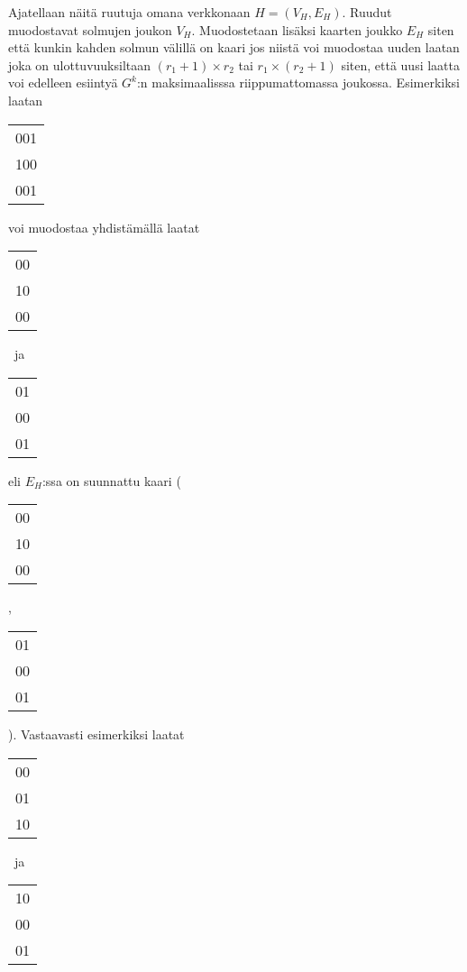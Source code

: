 \documentclass[12pt,finnish]{tktltiki2}
\theoremstyle{definition}
\theoremstyle{remark}
\begin{document}
Ajatellaan näitä ruutuja omana verkkonaan $H = (V_H, E_H)$. Ruudut muodostavat solmujen joukon $V_H$. Muodostetaan lisäksi kaarten joukko $E_H$ siten että kunkin kahden solmun välillä on kaari jos niistä voi muodostaa uuden laatan joka on ulottuvuuksiltaan $(r_1 + 1) \times r_2$ tai $r_1 \times (r_2 + 1)$ siten, että uusi laatta voi edelleen esiintyä $G^k$:n maksimaalisssa riippumattomassa joukossa. Esimerkiksi laatan
\begin{center}
\begin{tabular}{ | c | }
  \hline
  001 \\
  100 \\
  001 \\
  \hline
\end{tabular}
\end{center}
voi muodostaa yhdistämällä laatat
\begin{center}
\begin{tabular}{ | c | }
  \hline
  00 \\
  10 \\
  00 \\
  \hline
\end{tabular}
~ja~ 
\begin{tabular}{ | c | }
  \hline
  01 \\
  00 \\
  01 \\
  \hline
\end{tabular}
\end{center}
eli $E_H$:ssa on suunnattu kaari
\Bigg(
\begin{tabular}{ | c | }
  \hline
  00 \\
  10 \\
  00 \\
  \hline
\end{tabular}
,
\begin{tabular}{ | c | }
  \hline
  01 \\
  00 \\
  01 \\
  \hline
\end{tabular}
\Bigg). Vastaavasti esimerkiksi laatat
\begin{center}
\begin{tabular}{| c |}
 \hline
 00 \\
 01 \\
 10 \\
 \hline
\end{tabular}
~ja~
\begin{tabular}{| c |}
 \hline
 10 \\
 00 \\
 01 \\
 \hline
\end{tabular}
\end{center}
\end{document}
